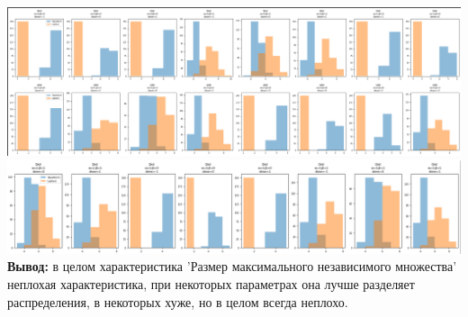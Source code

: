 \hspace*{-1cm}
\includegraphics[width=1\textwidth]{Part-I-Ivanova/2_hist.png}
\\
\hspace*{-0.5cm}
\includegraphics[width=1\textwidth]{Part-I-Ivanova/3_hist.png}\\ 


\noindent\textbf{Вывод:} в целом характеристика 'Размер максимального независимого множества' неплохая характеристика, при некоторых параметрах она лучше разделяет распределения, в некоторых хуже, но в целом всегда неплохо.
